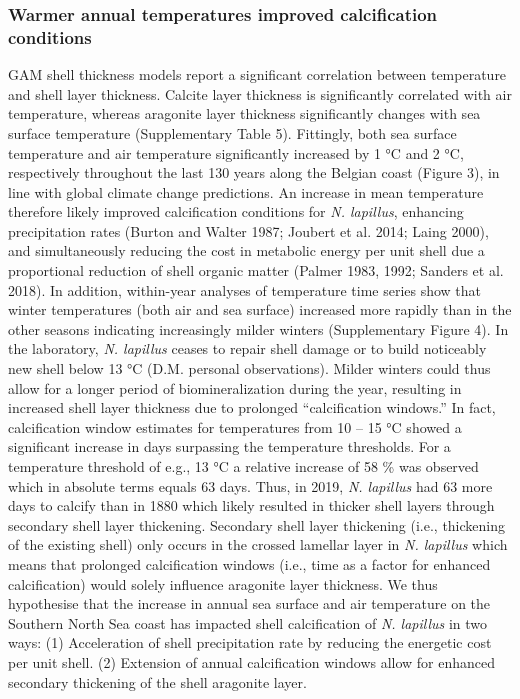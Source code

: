 \documentclass[smallextended]{svjour3}       %
\begin{document}
\hypertarget{warmer-annual-temperatures-improved-calcification-conditions}{%
\subsubsection{Warmer annual temperatures improved calcification
conditions}\label{warmer-annual-temperatures-improved-calcification-conditions}}

GAM shell thickness models report a significant correlation between
temperature and shell layer thickness. Calcite layer thickness is
significantly correlated with air temperature, whereas aragonite layer
thickness significantly changes with sea surface temperature
(Supplementary Table 5). Fittingly, both sea surface temperature and air
temperature significantly increased by 1 °C and 2 °C, respectively
throughout the last 130 years along the Belgian coast (Figure 3), in
line with global climate change predictions. An increase in mean
temperature therefore likely improved calcification conditions for
\emph{N. lapillus}, enhancing precipitation rates (Burton and Walter
1987; Joubert et al. 2014; Laing 2000), and simultaneously reducing the
cost in metabolic energy per unit shell due a proportional reduction of
shell organic matter (Palmer 1983, 1992; Sanders et al. 2018). In
addition, within-year analyses of temperature time series show that
winter temperatures (both air and sea surface) increased more rapidly
than in the other seasons indicating increasingly milder winters
(Supplementary Figure 4). In the laboratory, \emph{N. lapillus} ceases
to repair shell damage or to build noticeably new shell below 13 °C
(D.M. personal observations). Milder winters could thus allow for a
longer period of biomineralization during the year, resulting in
increased shell layer thickness due to prolonged ``calcification
windows.'' In fact, calcification window estimates for temperatures from
10 -- 15 °C showed a significant increase in days surpassing the
temperature thresholds. For a temperature threshold of e.g., 13 °C a
relative increase of 58 \% was observed which in absolute terms equals
63 days. Thus, in 2019, \emph{N. lapillus} had 63 more days to calcify
than in 1880 which likely resulted in thicker shell layers through
secondary shell layer thickening. Secondary shell layer thickening
(i.e., thickening of the existing shell) only occurs in the crossed
lamellar layer in \emph{N. lapillus} which means that prolonged
calcification windows (i.e., time as a factor for enhanced
calcification) would solely influence aragonite layer thickness. We thus
hypothesise that the increase in annual sea surface and air temperature
on the Southern North Sea coast has impacted shell calcification of
\emph{N. lapillus} in two ways: (1) Acceleration of shell precipitation
rate by reducing the energetic cost per unit shell. (2) Extension of
annual calcification windows allow for enhanced secondary thickening of
the shell aragonite layer.
\end{document}
